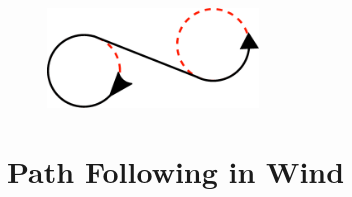 \begin{figure}[htbp!] 
\centering    
\includegraphics[width=0.5\textwidth]{RSL}
\caption[Dubins RSL Path]{}
\label{fig:rsl}
\end{figure}

\section{Path Following in Wind}
\label{litrev:path}
